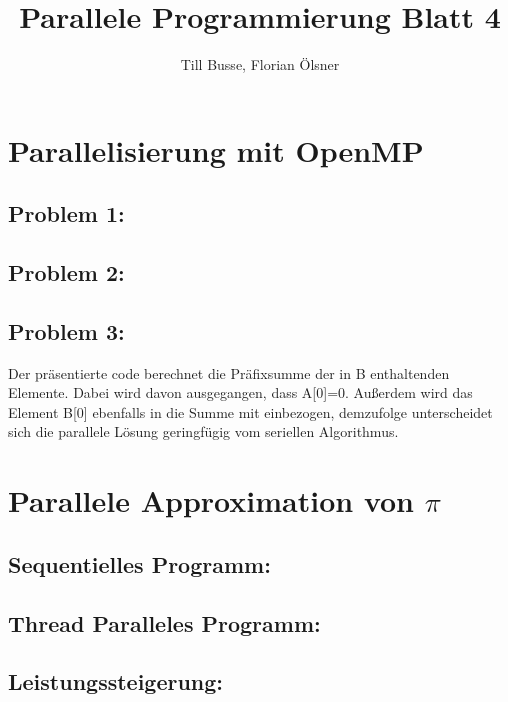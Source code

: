 \documentclass[12pt,a4paper]{article}
\author{Till Busse, Florian Ölsner}
\title{Parallele Programmierung Blatt 4}
\begin{document}
\maketitle
\pagebreak
\section{Parallelisierung mit OpenMP}
\subsection{Problem 1:}

\subsection{Problem 2:}

\subsection{Problem 3:}
%

Der präsentierte code berechnet die Präfixsumme der in B enthaltenden Elemente. Dabei wird davon ausgegangen, dass A[0]=0. Außerdem wird das Element B[0] ebenfalls in die Summe mit einbezogen, demzufolge unterscheidet sich die parallele Lösung geringfügig vom seriellen Algorithmus.
\newpage
\section{Parallele Approximation von $\pi$}
\subsection{Sequentielles Programm:}

\subsection{Thread Paralleles Programm:}

\subsection{Leistungssteigerung:}
\end{document}
